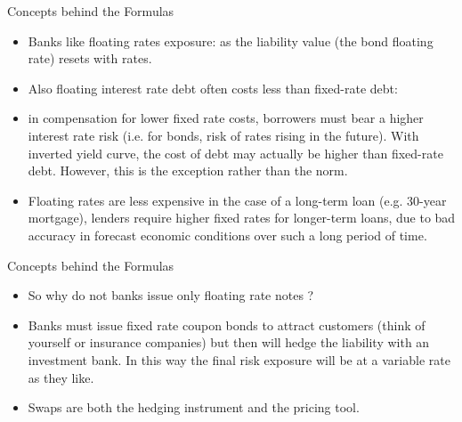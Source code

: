 \documentclass{beamer}
\begin{document}
\begin{frame}{Concepts behind the Formulas}
	\begin{itemize}
		\item Banks like floating rates exposure: as the liability value (the bond floating rate) resets with rates.
		\item Also floating interest rate debt often costs less than fixed-rate debt:
		\item  in compensation for lower fixed rate costs, borrowers must bear a higher interest rate risk (i.e. for bonds, risk of rates rising in the future). With inverted yield curve, the cost of debt may actually be higher than fixed-rate debt. However, this is the exception rather than the norm.
		\item  Floating rates are less expensive in the case of a long-term loan (e.g. 30-year mortgage), lenders require higher fixed rates for longer-term loans, due to bad accuracy in forecast economic conditions over such a long period of time.%
	\end{itemize}
\end{frame}

\begin{frame}{Concepts behind the Formulas}
	\begin{itemize}
		\item So why do not banks issue only floating rate notes ?
		\item Banks must issue fixed rate coupon bonds to attract customers (think of yourself or insurance companies) but then will hedge the liability  with an investment bank. In this way the final risk exposure will be at a variable rate as they like. 
		\item Swaps are both the hedging instrument and the pricing tool.%
	\end{itemize}
\end{frame}
\end{document}
